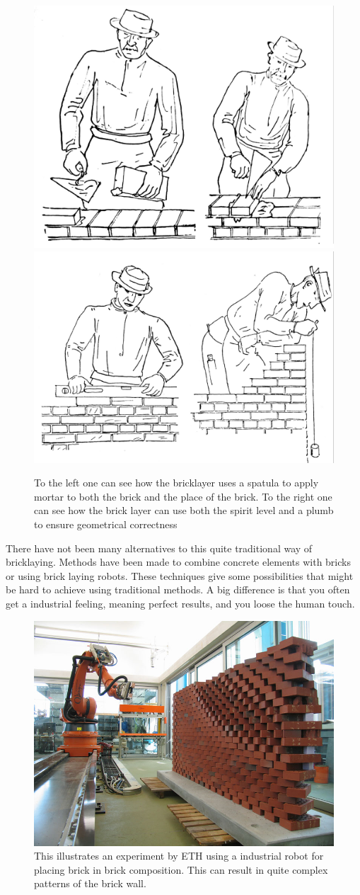 \begin{figure}[H]
\centering
\includegraphics[width=0.45\linewidth ]{figure/Introduction/bricklayer2.pdf}
\includegraphics[width=0.45\linewidth ]{figure/Introduction/bricklayer1.pdf}
\caption{To the left one can see how the bricklayer uses a spatula to apply mortar to both the brick and the place of the brick. To the right one can see how the brick layer can use both the spirit level and a plumb to ensure geometrical correctness\cite{ref:murning}}
\label{fig:murning2}
\end{figure}



There have not been many alternatives to this quite traditional way of bricklaying. Methods have been made to combine concrete elements with bricks or using brick laying robots. These techniques give some possibilities that might be hard to achieve using traditional methods. A big difference is that you often get a industrial feeling, meaning perfect results, and you loose the human touch.

\begin{figure}[H]
\centering
\includegraphics[width=0.8\linewidth ]{figure/Introduction/RobotBrick.jpg}
\caption{This illustrates an experiment by ETH using a industrial robot for placing brick in brick composition. This can result in quite complex patterns of the brick wall.}
\end{figure}



